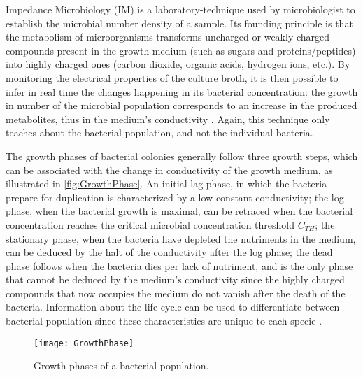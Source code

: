 Impedance Microbiology (IM) \cite{stewart1899charges} is a laboratory-technique used by microbiologist to establish the microbial number density of a sample. Its founding principle is that the metabolism of microorganisms transforms uncharged or weakly charged compounds present in the growth medium (such as sugars and proteins/peptides) into highly charged ones (carbon dioxide, organic acids, hydrogen ions, etc.). By monitoring the electrical properties of the culture broth, it is then possible to infer in real time the changes happening in its bacterial concentration: the growth in number of the microbial population corresponds to an increase in the produced metabolites, thus in the medium’s conductivity \cite{Grossi2017,Kargupta2018,Xu2016}. Again, this technique only teaches about the bacterial population, and not the individual bacteria. \par

The growth phases of bacterial colonies generally follow three growth steps, which can be associated with the change in conductivity of the growth medium, as illustrated in \autoref{fig:GrowthPhase}. An initial lag phase, in which the bacteria prepare for duplication is characterized by a low constant conductivity; the log phase, when the bacterial growth is maximal, can be retraced when the bacterial concentration reaches the critical microbial concentration threshold $C_{TH}$; the stationary phase, when the bacteria have depleted the nutriments in the medium, can be deduced by the halt of the conductivity after the log phase; the dead phase follows when the bacteria dies per lack of nutriment, and is the only phase that cannot be deduced by the medium’s conductivity since the highly charged compounds that now occupies the medium do not vanish after the death of the bacteria. Information about the life cycle can be used to differentiate between bacterial population since these characteristics are unique to each specie \cite{Sylvain2018}. 
\begin{figure}[h]
    \centering
    \texttt{[image: GrowthPhase]}
    \caption{Growth phases of a bacterial population.\citep{wang2015bacterial}}
    \label{fig:GrowthPhase}
\end{figure}

